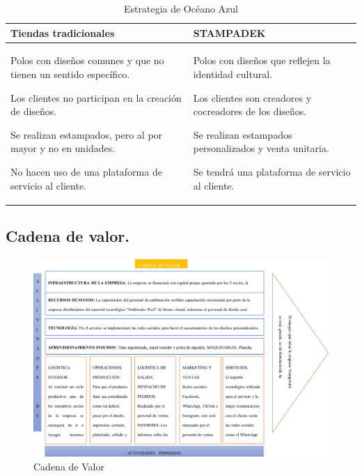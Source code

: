 \documentclass[a4paper,openright,12pt]{book}
\begin{document}
\begin{table}[H] %
\centering
\begin{tabular}{p{7cm}p{7cm}}
\hline
\textbf{Tiendas tradicionales}                                             & \textbf{STAMPADEK}                            \\
\hline %
Polos con diseños comunes y que no tienen un sentido específico.

Los clientes no participan en la creación de diseños.

Se realizan estampados, pero al por mayor y no en unidades.

No hacen uso de una plataforma de servicio al cliente.

                                                                          &     Polos con diseños que reflejen la identidad cultural.

Los clientes son creadores y cocreadores de los diseños.

Se realizan estampados personalizados y venta unitaria.

Se tendrá una plataforma de servicio al cliente.                                                                                \\
\hline
\end{tabular}
\caption{Estrategia de Océano Azul}
\label{Tabla2}
\end{table}

\subsection{Cadena de valor.}

\begin{figure}[h]
\centering
\raggedright
\includegraphics[scale=0.6]{Figuras/CadenaValor.png}
\caption{Cadena de Valor}
\label{figura1}
\end{figure}
\end{document}
